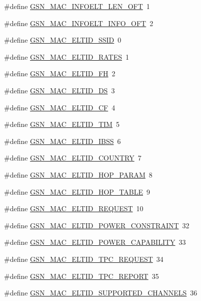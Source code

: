 \begin{DoxyCompactItemize}
\item 
\#define \hyperlink{a00523_a41fd50eac301ab858e2f0f7779ab9fb2}{GSN\_\-MAC\_\-INFOELT\_\-LEN\_\-OFT}~1
\item 
\#define \hyperlink{a00523_a0732490eac2d78f09280a32f3d212497}{GSN\_\-MAC\_\-INFOELT\_\-INFO\_\-OFT}~2
\item 
\#define \hyperlink{a00523_a6b416ff408a6f95dbdff53024d7b3b2b}{GSN\_\-MAC\_\-ELTID\_\-SSID}~0
\item 
\#define \hyperlink{a00523_aa284ef171fe5182bcb5457f85feb65aa}{GSN\_\-MAC\_\-ELTID\_\-RATES}~1
\item 
\#define \hyperlink{a00523_a7ade8f55825d871d501cf080f43506eb}{GSN\_\-MAC\_\-ELTID\_\-FH}~2
\item 
\#define \hyperlink{a00523_a5b7b7c6ca167623275bdfab4be83bce8}{GSN\_\-MAC\_\-ELTID\_\-DS}~3
\item 
\#define \hyperlink{a00523_a1a6e47e5e3532688addff1fc1295e1b2}{GSN\_\-MAC\_\-ELTID\_\-CF}~4
\item 
\#define \hyperlink{a00523_a9520497625163f70d0bbbd0b4a5b728d}{GSN\_\-MAC\_\-ELTID\_\-TIM}~5
\item 
\#define \hyperlink{a00523_a7cb8a958d39ce3ce9b01b9183ddc7955}{GSN\_\-MAC\_\-ELTID\_\-IBSS}~6
\item 
\#define \hyperlink{a00523_aa407ce89828edf1afbbe91d68a52bb07}{GSN\_\-MAC\_\-ELTID\_\-COUNTRY}~7
\item 
\#define \hyperlink{a00523_a857dd8bbe9e2b50f549796d8716e48ea}{GSN\_\-MAC\_\-ELTID\_\-HOP\_\-PARAM}~8
\item 
\#define \hyperlink{a00523_a9c46ccc77c25ce912c7afed2039cc07a}{GSN\_\-MAC\_\-ELTID\_\-HOP\_\-TABLE}~9
\item 
\#define \hyperlink{a00523_af0ffed09e4c3723ac65becff8b6f2bfb}{GSN\_\-MAC\_\-ELTID\_\-REQUEST}~10
\item 
\#define \hyperlink{a00523_a36e02d3ccab307876a3f67fb5e469c38}{GSN\_\-MAC\_\-ELTID\_\-POWER\_\-CONSTRAINT}~32
\item 
\#define \hyperlink{a00523_aed7f21f9e5d99e9524709b96b95ffe5c}{GSN\_\-MAC\_\-ELTID\_\-POWER\_\-CAPABILITY}~33
\item 
\#define \hyperlink{a00523_a11dd89531485dd050368ebc7b1beeecf}{GSN\_\-MAC\_\-ELTID\_\-TPC\_\-REQUEST}~34
\item 
\#define \hyperlink{a00523_a4aefd4b7c9e47964d6f2f6e0a756387b}{GSN\_\-MAC\_\-ELTID\_\-TPC\_\-REPORT}~35
\item 
\#define \hyperlink{a00523_ad0f340b4fb36c818e1fe1962bc3e896b}{GSN\_\-MAC\_\-ELTID\_\-SUPPORTED\_\-CHANNELS}~36

\end{DoxyCompactItemize}
